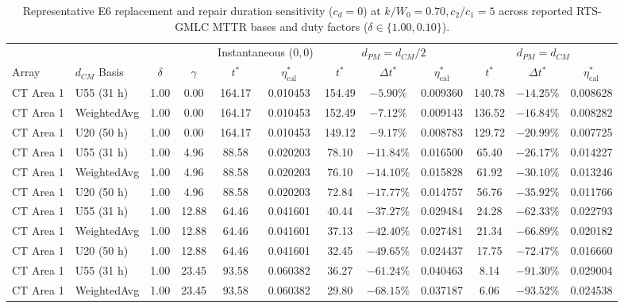 \documentclass[10pt,a4paper]{article}
\begin{document}
\begin{table}[htbp]
\centering
\scriptsize
\setlength{\tabcolsep}{1.8pt}
\caption{Representative E6 replacement and repair duration sensitivity ($c_d = 0$) at $k/W_0 = 0.70, c_2/c_1 = 5$ across reported RTS-GMLC MTTR bases and duty factors ($\delta \in \{1.00, 0.10\}$).}
\label{tab:S9}
\begin{tabular*}{\textwidth}{@{\extracolsep{\fill}}llcc|cc|ccc|ccc@{}}
\toprule
 & & & & \multicolumn{2}{c|}{Instantaneous ($0,0$)} & \multicolumn{3}{c|}{$d_{PM} = d_{CM}/2$} & \multicolumn{3}{c}{$d_{PM} = d_{CM}$} \\
Array & $d_{CM}$ Basis & $\delta$ & $\gamma$ & $t^*$ & $\eta_{\mathrm{cal}}^*$ & $t^*$ & $\Delta t^*$ & $\eta_{\mathrm{cal}}^*$ & $t^*$ & $\Delta t^*$ & $\eta_{\mathrm{cal}}^*$ \\
\midrule
CT Area 1 & U55 (31 h)    & 1.00 & 0.00  & 164.17 & 0.010453 & 154.49 & $-5.90\%$  & 0.009360 & 140.78 & $-14.25\%$ & 0.008628 \\
CT Area 1 & WeightedAvg   & 1.00 & 0.00  & 164.17 & 0.010453 & 152.49 & $-7.12\%$  & 0.009143 & 136.52 & $-16.84\%$ & 0.008282 \\
CT Area 1 & U20 (50 h)    & 1.00 & 0.00  & 164.17 & 0.010453 & 149.12 & $-9.17\%$  & 0.008783 & 129.72 & $-20.99\%$ & 0.007725 \\
CT Area 1 & U55 (31 h)    & 1.00 & 4.96  & 88.58  & 0.020203 & 78.10  & $-11.84\%$ & 0.016500 & 65.40  & $-26.17\%$ & 0.014227 \\
CT Area 1 & WeightedAvg   & 1.00 & 4.96  & 88.58  & 0.020203 & 76.10  & $-14.10\%$ & 0.015828 & 61.92  & $-30.10\%$ & 0.013246 \\
CT Area 1 & U20 (50 h)    & 1.00 & 4.96  & 88.58  & 0.020203 & 72.84  & $-17.77\%$ & 0.014757 & 56.76  & $-35.92\%$ & 0.011766 \\
CT Area 1 & U55 (31 h)    & 1.00 & 12.88 & 64.46  & 0.041601 & 40.44  & $-37.27\%$ & 0.029484 & 24.28  & $-62.33\%$ & 0.022793 \\
CT Area 1 & WeightedAvg   & 1.00 & 12.88 & 64.46  & 0.041601 & 37.13  & $-42.40\%$ & 0.027481 & 21.34  & $-66.89\%$ & 0.020182 \\
CT Area 1 & U20 (50 h)    & 1.00 & 12.88 & 64.46  & 0.041601 & 32.45  & $-49.65\%$ & 0.024437 & 17.75  & $-72.47\%$ & 0.016660 \\
CT Area 1 & U55 (31 h)    & 1.00 & 23.45 & 93.58  & 0.060382 & 36.27  & $-61.24\%$ & 0.040463 & 8.14   & $-91.30\%$ & 0.029004 \\
CT Area 1 & WeightedAvg   & 1.00 & 23.45 & 93.58  & 0.060382 & 29.80  & $-68.15\%$ & 0.037187 & 6.06   & $-93.52\%$ & 0.024538 \\

\end{tabular*}
\end{table}
\end{document}
